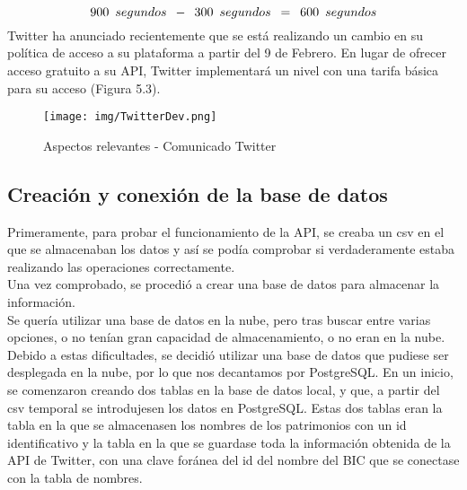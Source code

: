     $$ 900\hspace{0.5em}segundos\hspace{0.5em}-\hspace{0.5em} 300\hspace{0.5em}segundos\hspace{0.5em}=\hspace{0.5em}600\hspace{0.5em}segundos$$
Twitter ha anunciado recientemente que se está realizando un cambio en su política de acceso a su plataforma a partir del 9 de Febrero. En lugar de ofrecer acceso gratuito a su API, Twitter implementará un nivel con una tarifa básica para su acceso (Figura 5.3).\\
\begin{figure}[h!]
    \centering
    \texttt{[image: img/TwitterDev.png]} \\
    \caption{Aspectos relevantes - Comunicado Twitter}
    \label{Aspectos relevantes - Comunicado Twitter}
\end{figure}
\subsection{Creación y conexión de la base de datos}
Primeramente, para probar el funcionamiento de la API, se creaba un csv en el que se almacenaban los datos y así se podía comprobar si verdaderamente estaba realizando las operaciones correctamente.\\ Una vez comprobado, se procedió a crear una base de datos para almacenar la información. \\
Se quería utilizar una base de datos en la nube, pero tras buscar entre varias opciones, o no tenían gran capacidad de almacenamiento, o no eran en la nube. Debido a estas dificultades, se decidió utilizar una base de datos que pudiese ser desplegada en la nube, por lo que nos decantamos por PostgreSQL.
En un inicio, se comenzaron creando dos tablas en la base de datos local, y que, a partir del csv temporal se introdujesen los datos en PostgreSQL. Estas dos tablas eran la tabla en la que se almacenasen los nombres de los patrimonios con un id identificativo y la tabla en la que se guardase toda la información obtenida de la API de Twitter, con una clave foránea del id del nombre del BIC que se conectase con la tabla de nombres.

